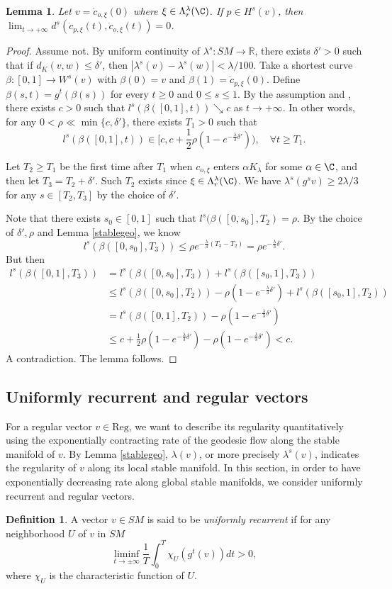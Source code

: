 \documentclass[11pt]{amsart}
\newtheorem{lemma}[theorem]{Lemma}
\theoremstyle{definition}
\newtheorem{definition}[theorem]{Definition}
\def\RR{{\mathbb R}}
\def\a{\alpha}
\def\b{\beta}
\def\d{\delta}   %
\def\l{\lambda}   \def\L{\Lambda}
\begin{document}
\begin{lemma}\label{limitzero1}
Let $v=\dot{c}_{o,\xi}(0)$ where $\xi\in \L_r^\l(\C)$. If $p\in H^s(v)$, then $\lim_{t\to +\infty}d^s(\dot c_{p,\xi}(t), \dot c_{o,\xi}(t))=0$.
\end{lemma}
\begin{proof}
Assume not. By uniform continuity of $\l^s:SM\to \RR$, there exists $\d'>0$ such that if $d_K(v,w)\le \d'$, then $|\l^s(v)-\l^s(w)|<\l/100$. Take a shortest curve $\beta: [0,1]\to W^s(v)$ with $\beta(0)=v$ and $\b(1)=\dot c_{p,\xi}(0)$. Define $\b(s,t)=g^t(\b(s))$ for every $t\ge 0$ and $0\le s\le1$. By the assumption and \cite[Lemma 2.13]{BCFT}, there exists $c>0$ such that $l^s(\b([0,1],t))\searrow c$ as $t\to +\infty$. In other words, for any $0<\rho\ll \min\{c,\d'\}$, there exists $T_1>0$ such that 
$$l^s(\b([0,1],t))\in [c, c+\frac{1}{2}\rho (1-e^{-\frac{\l}{3}\d'})), \quad \forall t\ge T_1.$$

Let $T_2\ge T_1$ be the first time after $T_1$ when $c_{o,\xi}$ enters $\a K_\l$ for some $\a\in \C$, and then let $T_3=T_2+\d'$. Such $T_2$ exists since $\xi\in \L_r^\l(\C)$. We have $\l^s(g^sv)\ge 2\l/3$ for any $s\in [T_2,T_3]$ by the choice of $\d'$.

Note that there exists $s_0\in [0,1]$ such that $l^{s}(\b([0,s_0],T_2)=\rho.$
By the choice of $\d',\rho$ and Lemma \ref{stablegeo}, we know 
$$l^s(\b([0,s_0],T_3))\le \rho e^{-\frac{\l}{3}(T_3-T_2)}= \rho e^{-\frac{\l}{3}\d'}.$$
But then 
\begin{equation*}
\begin{aligned}
l^s(\b([0,1],T_3))&=  l^s(\b([0,s_0],T_3))+ l^s(\b([s_0,1],T_3))\\
&\le  l^s(\b([0,s_0],T_2))-\rho(1-e^{-\frac{\l}{3}\d'})+l^s(\b([s_0,1],T_2))\\
&=  l^s(\b([0,1],T_2))-\rho (1-e^{-\frac{\l}{3}\d'})\\
&\le c+\frac{1}{2}\rho (1-e^{-\frac{\l}{3}\d'})-\rho (1-e^{-\frac{\l}{3}\d'})<c.
\end{aligned}
\end{equation*}
A contradiction. The lemma follows.
\end{proof}

\subsection{Uniformly recurrent and regular vectors}
For a regular vector $v\in \text{Reg}$, we want to describe its regularity quantitatively using the exponentially contracting rate of the geodesic flow along the stable manifold of $v$. By Lemma \ref{stablegeo}, $\l(v)$, or more precisely $\l^s(v)$, indicates the regularity of $v$ along its local stable manifold. In this section, in order to have exponentially decreasing rate along global stable manifolds, we consider uniformly recurrent and regular vectors.
\begin{definition}\label{uniformlyrecurrent}
A vector $v\in SM$ is said to be \emph{uniformly recurrent} if for any neighborhood $U$ of $v$ in $SM$
$$\liminf_{t \to \pm \infty} \frac{1}{T}\int_0^T \chi_U(g^t(v))dt > 0,$$
where $\chi_U$ is the characteristic function of $U$.
\end{definition}
\end{document}
